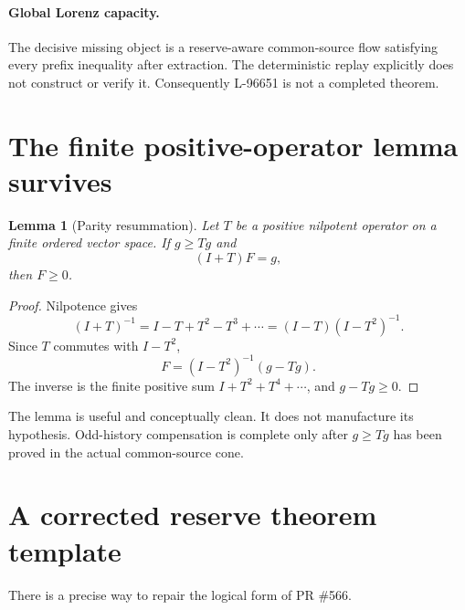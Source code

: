 \documentclass[11pt]{article}
\newtheorem{lemma}[theorem]{Lemma}
\newcommand{\1}{\mathbf 1}
\begin{document}
\paragraph{Global Lorenz capacity.}
The decisive missing object is a reserve-aware common-source flow satisfying every prefix inequality after extraction.  The deterministic replay explicitly does not construct or verify it.  Consequently L-96651 is not a completed theorem.

\section{The finite positive-operator lemma survives}

\begin{lemma}[Parity resummation]\label{lem:operator}
Let $T$ be a positive nilpotent operator on a finite ordered vector space.  If $g\ge Tg$ and
\[
(I+T)F=g,
\]
then $F\ge0$.
\end{lemma}
\begin{proof}
Nilpotence gives
\[
(I+T)^{-1}=I-T+T^2-T^3+\cdots
=(I-T)(I-T^2)^{-1}.
\]
Since $T$ commutes with $I-T^2$,
\[
F=(I-T^2)^{-1}(g-Tg).
\]
The inverse is the finite positive sum $I+T^2+T^4+\cdots$, and $g-Tg\ge0$.
\end{proof}

The lemma is useful and conceptually clean.  It does not manufacture its hypothesis.  Odd-history compensation is complete only after $g\ge Tg$ has been proved in the actual common-source cone.

\section{A corrected reserve theorem template}

There is a precise way to repair the logical form of PR \#566.
\end{document}

